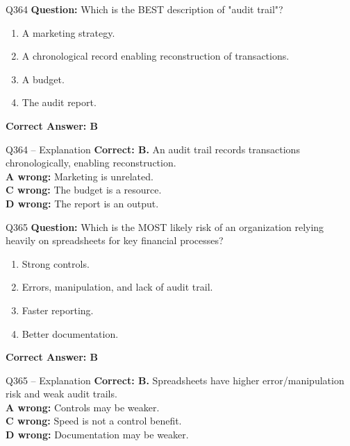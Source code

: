 \documentclass[aspectratio=169,10pt]{beamer}
\begin{document}
	\begin{frame}[t]{Q364}
		\small
		\textbf{Question:} Which is the BEST description of "audit trail"?
		\begin{enumerate}[label=\Alph*.,itemsep=1pt,topsep=2pt]
			\item A marketing strategy.
			\item A chronological record enabling reconstruction of transactions.
			\item A budget.
			\item The audit report.
		\end{enumerate}
		\vspace{4pt}
		\textbf{Correct Answer: B}
	\end{frame}
	
	\begin{frame}[t]{Q364 -- Explanation}
		\small
		\textbf{Correct: B.} An audit trail records transactions chronologically, enabling reconstruction. \\[4pt]
		\textbf{A wrong:} Marketing is unrelated. \\[2pt]
		\textbf{C wrong:} The budget is a resource. \\[2pt]
		\textbf{D wrong:} The report is an output.
	\end{frame}
	
	\begin{frame}[t]{Q365}
		\small
		\textbf{Question:} Which is the MOST likely risk of an organization relying heavily on spreadsheets for key financial processes?
		\begin{enumerate}[label=\Alph*.,itemsep=1pt,topsep=2pt]
			\item Strong controls.
			\item Errors, manipulation, and lack of audit trail.
			\item Faster reporting.
			\item Better documentation.
		\end{enumerate}
		\vspace{4pt}
		\textbf{Correct Answer: B}
	\end{frame}
	
	\begin{frame}[t]{Q365 -- Explanation}
		\small
		\textbf{Correct: B.} Spreadsheets have higher error/manipulation risk and weak audit trails. \\[4pt]
		\textbf{A wrong:} Controls may be weaker. \\[2pt]
		\textbf{C wrong:} Speed is not a control benefit. \\[2pt]
		\textbf{D wrong:} Documentation may be weaker.
	\end{frame}
	
\end{document}
